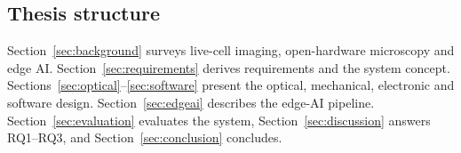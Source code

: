 \subsection{Thesis structure}
Section~\ref{sec:background} surveys live-cell imaging, open-hardware microscopy
and edge AI. Section~\ref{sec:requirements} derives requirements and the system
concept. Sections~\ref{sec:optical}--\ref{sec:software} present the optical,
mechanical, electronic and software design. Section~\ref{sec:edgeai} describes
the edge-AI pipeline. Section~\ref{sec:evaluation} evaluates the system,
Section~\ref{sec:discussion} answers RQ1--RQ3, and
Section~\ref{sec:conclusion} concludes.
